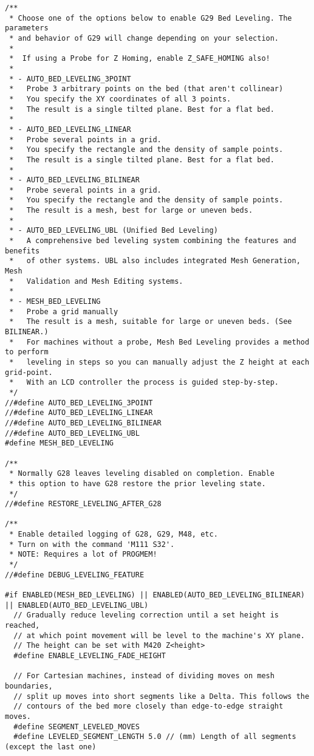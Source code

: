 \begin{lstlisting}[caption = キャプション, label = ラベル]
/**
 * Choose one of the options below to enable G29 Bed Leveling. The parameters
 * and behavior of G29 will change depending on your selection.
 *
 *  If using a Probe for Z Homing, enable Z_SAFE_HOMING also!
 *
 * - AUTO_BED_LEVELING_3POINT
 *   Probe 3 arbitrary points on the bed (that aren't collinear)
 *   You specify the XY coordinates of all 3 points.
 *   The result is a single tilted plane. Best for a flat bed.
 *
 * - AUTO_BED_LEVELING_LINEAR
 *   Probe several points in a grid.
 *   You specify the rectangle and the density of sample points.
 *   The result is a single tilted plane. Best for a flat bed.
 *
 * - AUTO_BED_LEVELING_BILINEAR
 *   Probe several points in a grid.
 *   You specify the rectangle and the density of sample points.
 *   The result is a mesh, best for large or uneven beds.
 *
 * - AUTO_BED_LEVELING_UBL (Unified Bed Leveling)
 *   A comprehensive bed leveling system combining the features and benefits
 *   of other systems. UBL also includes integrated Mesh Generation, Mesh
 *   Validation and Mesh Editing systems.
 *
 * - MESH_BED_LEVELING
 *   Probe a grid manually
 *   The result is a mesh, suitable for large or uneven beds. (See BILINEAR.)
 *   For machines without a probe, Mesh Bed Leveling provides a method to perform
 *   leveling in steps so you can manually adjust the Z height at each grid-point.
 *   With an LCD controller the process is guided step-by-step.
 */
//#define AUTO_BED_LEVELING_3POINT
//#define AUTO_BED_LEVELING_LINEAR
//#define AUTO_BED_LEVELING_BILINEAR
//#define AUTO_BED_LEVELING_UBL
#define MESH_BED_LEVELING

/**
 * Normally G28 leaves leveling disabled on completion. Enable
 * this option to have G28 restore the prior leveling state.
 */
//#define RESTORE_LEVELING_AFTER_G28

/**
 * Enable detailed logging of G28, G29, M48, etc.
 * Turn on with the command 'M111 S32'.
 * NOTE: Requires a lot of PROGMEM!
 */
//#define DEBUG_LEVELING_FEATURE

#if ENABLED(MESH_BED_LEVELING) || ENABLED(AUTO_BED_LEVELING_BILINEAR) || ENABLED(AUTO_BED_LEVELING_UBL)
  // Gradually reduce leveling correction until a set height is reached,
  // at which point movement will be level to the machine's XY plane.
  // The height can be set with M420 Z<height>
  #define ENABLE_LEVELING_FADE_HEIGHT

  // For Cartesian machines, instead of dividing moves on mesh boundaries,
  // split up moves into short segments like a Delta. This follows the
  // contours of the bed more closely than edge-to-edge straight moves.
  #define SEGMENT_LEVELED_MOVES
  #define LEVELED_SEGMENT_LENGTH 5.0 // (mm) Length of all segments (except the last one)


\end{lstlisting}
